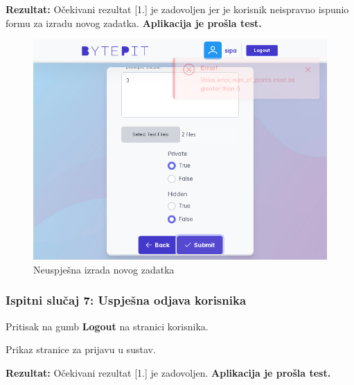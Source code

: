 			\noindent \textbf{Rezultat:} Očekivani rezultat [1.] je zadovoljen jer je korisnik neispravno ispunio formu za izradu novog zadatka. \textbf{Aplikacija je prošla test.}
			
			\begin{figure}[H]
				\includegraphics[scale=0.50]{slike/create_problem_test_wrong.PNG}
				\centering
				\caption{Neuspješna izrada novog zadatka}
				\label{fig:failed_new_problem}
			\end{figure}
			
			\eject
			
			\subsubsection{Ispitni slučaj 7: Uspješna odjava korisnika}
			
			
			\begin{packed_enum}
				
				\item  Pritisak na gumb \textbf{Logout} na stranici korisnika.
				
			\end{packed_enum}
			
			\begin{packed_enum}
				
				\item  Prikaz stranice za prijavu u sustav.
				
			\end{packed_enum}
			
			\noindent \textbf{Rezultat:} Očekivani rezultat [1.] je zadovoljen. \textbf{Aplikacija je prošla test.}
			
